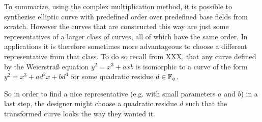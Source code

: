 To summarize, using the complex multiplication method, it is possible to synthezise elliptic curve with predefined order over predefined base fields from scratch. However the curves that are constructed this way are just some representatives of a larger class of curves, all of which have the same order. In applications it is therefore sometimes more advantageous to choose a different representative from that class. To do so recall from XXX, that any curve defined by the Weierstraß equation $y^2 = x^3 + ax b$ is isomorphic to a curve of the form $y^2 = x^3 + ad^2 x + bd^3$ for some quadratic residue $d\in \mathbb{F}_q$.

So in order to find a nice representative (e.g. with small parameters $a$ and $b$) in a last step, the designer might choose a quadratic residue $d$ such that the transformed curve looks the way they wanted it.


